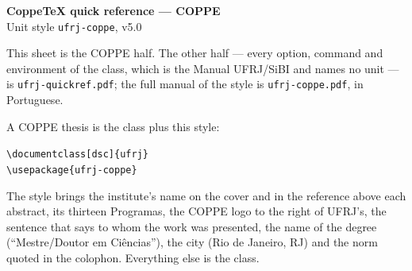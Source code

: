 \documentclass[a4paper,10pt]{article}
\newcommand\ufrjversion{v5.0}
\begin{document}
\begin{center}
  {\Large\bfseries CoppeTeX quick reference --- COPPE}\\[2pt]
  {\normalsize Unit style \texttt{ufrj-coppe}, \ufrjversion}\\[6pt]
  \begin{minipage}{0.92\textwidth}\small
  This sheet is the COPPE half. The other half --- every option, command and
  environment of the class, which is the Manual UFRJ/SiBI and names no unit ---
  is \texttt{ufrj-quickref.pdf}; the full manual of the style is
  \texttt{ufrj-coppe.pdf}, in Portuguese.

  \medskip
  A COPPE thesis is the class plus this style:

  \medskip
  \verb|\documentclass[dsc]{ufrj}|\\
  \verb|\usepackage{ufrj-coppe}|

  \medskip
  The style brings the institute's name on the cover and in the reference above
  each abstract, its thirteen Programas, the COPPE logo to the right of UFRJ's,
  the sentence that says to whom the work was presented, the name of the degree
  (``Mestre/Doutor em Ciências''), the city (Rio de Janeiro, RJ) and the norm
  quoted in the colophon. Everything else is the class.
  \end{minipage}
\end{center}

\vspace{6pt}
\end{document}

